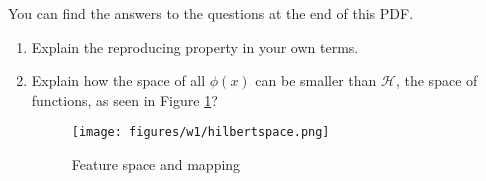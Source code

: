 \documentclass[12pt]{article}
\begin{document}
You can find the answers to the questions at the end of this PDF.

\begin{enumerate}
    \item Explain the reproducing property in your own terms.

    \item Explain how the space of all $\phi(x)$ can be smaller than $\mathcal{H}$, the space of functions, as seen in Figure \ref{fig:hilbertspace}? 
    \begin{figure}[h!]
        \centering
        \texttt{[image: figures/w1/hilbertspace.png]}
        \caption{Feature space and mapping}
        \label{fig:hilbertspace}
    \end{figure}
    
\end{enumerate}






%


\end{document}
